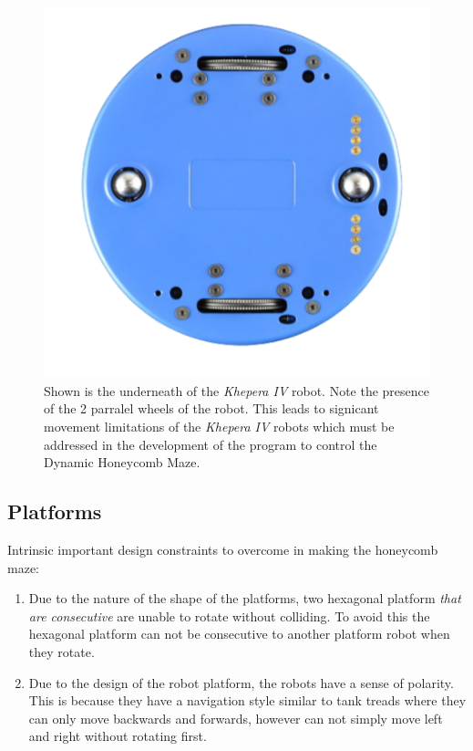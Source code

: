 \begin{figure}
    \centering
    \includegraphics[scale = 0.5]{images/khepera_IV_robot.png}
    \caption{Shown is the underneath of the \textit{Khepera IV} robot. Note the presence of the 2 parralel wheels of the robot. This leads to signicant movement limitations of the \textit{Khepera IV} robots which must be addressed in the development of the program to control the Dynamic Honeycomb Maze.}
    \label{fig:robot}
\end{figure}

\subsection{Platforms}

Intrinsic important design constraints to overcome in making the honeycomb maze:
\begin{enumerate}
    \item Due to the nature of the shape of the platforms, two hexagonal platform \textit{that are consecutive} are unable to rotate without colliding. To avoid this the hexagonal platform can not be consecutive to another platform robot when they rotate.
    \item Due to the design of the robot platform,  the robots have a sense of polarity. This is because they have a navigation style similar to tank treads where they can only move backwards and forwards, however can not simply move left and right without rotating first. 
\end{enumerate}



